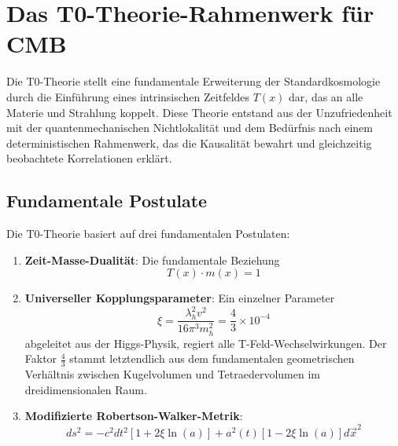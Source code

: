 \documentclass[12pt,a4paper]{article}
\newcommand{\Tfield}{T(x)}
\newcommand{\xipar}{\xi}
\theoremstyle{definition}
\theoremstyle{remark}
\begin{document}
	
	\section{Das T0-Theorie-Rahmenwerk f\"ur CMB}
	\label{sec:t0_framework}
	
	Die T0-Theorie stellt eine fundamentale Erweiterung der Standardkosmologie durch die Einf\"uhrung eines intrinsischen Zeitfeldes $\Tfield$ dar, das an alle Materie und Strahlung koppelt. Diese Theorie entstand aus der Unzufriedenheit mit der quantenmechanischen Nichtlokalit\"at und dem Bed\"urfnis nach einem deterministischen Rahmenwerk, das die Kausalit\"at bewahrt und gleichzeitig beobachtete Korrelationen erkl\"art.
	
	\subsection{Fundamentale Postulate}
	
	Die T0-Theorie basiert auf drei fundamentalen Postulaten:
	
	\begin{enumerate}
		\item \textbf{Zeit-Masse-Dualit\"at}: Die fundamentale Beziehung
		\begin{equation}
			\Tfield \cdot m(x) = 1
			\label{eq:time_mass_duality}
		\end{equation}
		
		\item \textbf{Universeller Kopplungsparameter}: Ein einzelner Parameter
		\begin{equation}
			\xipar = \frac{\lambda_h^2 v^2}{16\pi^3 m_h^2} = \frac{4}{3} \times 10^{-4}
			\label{eq:xi_definition}
		\end{equation}
		abgeleitet aus der Higgs-Physik, regiert alle T-Feld-Wechselwirkungen. Der Faktor $\frac{4}{3}$ stammt letztendlich aus dem fundamentalen geometrischen Verh\"altnis zwischen Kugelvolumen und Tetraedervolumen im dreidimensionalen Raum.
		
		\item \textbf{Modifizierte Robertson-Walker-Metrik}:
		\begin{equation}
			ds^2 = -c^2dt^2[1 + 2\xipar\ln(a)] + a^2(t)[1 - 2\xipar\ln(a)]d\vec{x}^2
			\label{eq:modified_metric}
		\end{equation}
	\end{enumerate}
	
\end{document}
